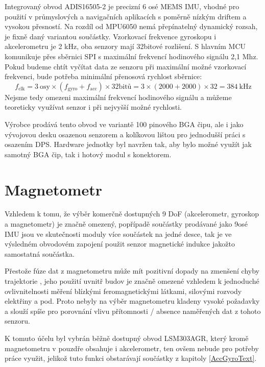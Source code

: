 Integrovaný obvod ADIS16505-2 je precizní 6 osé \ac{MEMS} \ac{IMU}, vhodné pro použití v průmyslových a navigačních aplikacích s poměrně nízkým driftem a vysokou přesností. Na rozdíl od MPU6050 nemá přepínatelný dynamický rozsah, je fixně daný variantou součástky. Vzorkovací frekvence gyroskopu i akcelerometru je 2 kHz, oba senzory mají 32bitové rozlišení. S hlavním \ac{MCU} komunikuje přes sběrnici \ac{SPI} s maximální frekvencí hodinového signálu 2,1 Mhz. \cite{UZFqHmQU7ZzI3OLB} Pokud budeme chtít vyčítat data ze senzoru při maximální možné vzorkovací frekvenci, bude potřeba minimální přenosová rychlost sběrnice: 
\begin{equation}
f_{\mathrm{clk}}=3~\mathrm{osy} \times(f_{\mathrm{gyro}} + f_{\mathrm{acc}})\times \mathrm{32bitů}=3\times(2000+2000)\times 32=\SI{384}{\kilo\hertz}
\end{equation}
Nejsme tedy omezeni maximální frekvencí hodinového signálu a můžeme teoreticky využívat senzor i při nejvyšší možné rychlosti.

Výrobce prodává tento obvod ve variantě 100 pinového \ac{BGA} čipu, ale i jako vývojovou desku osazenou senzorem a kolíkovou lištou pro jednodušší práci s osazením \ac{DPS}. \cite{UZFqHmQU7ZzI3OLB} Hardware jednotky byl navržen tak, aby bylo možné využít jak samotný \ac{BGA} čip, tak i hotový modul s konektorem.

\section{Magnetometr}
Vzhledem k tomu, že výběr komerčně dostupných 9 \ac{DoF} (akcelerometr, gyroskop a magnetometr) je značně omezený, popřípadě součástky prodávané jako 9osé IMU jsou ve skutečnosti moduly více součástek na jedné desce, tak je ve výsledném obvodovém zapojení použit senzor magnetické indukce jakožto samostatná součástka. 

Přestože fúze dat z magnetometru může mít pozitivní dopady na zmenšení chyby trajektorie \cite{Tkhorenko2018}, jeho použití uvnitř budov je značně omezené vzhledem k jednoduché ovlivnitelnosti měření blízkými feromagnetickými látkami, silovými rozvody elektřiny a pod. Proto nebyly na výběr magnetometru kladeny vysoké požadavky a slouží spíše pro porovnání vlivu přítomnosti / absence naměřených dat z tohoto senzoru.

K tomuto účelu byl vybrán běžně dostupný obvod LSM303AGR, který kromě magnetometru v pouzdře obsahuje i akcelerometr, ten ovšem nebude pro potřeby práce využit, jelikož tuto funkci obstarávají součástky z kapitoly \ref{AccGyroText}.


